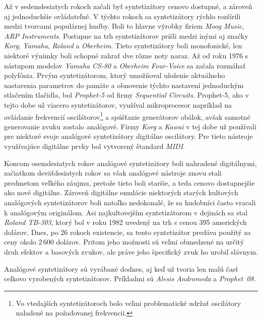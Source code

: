 Až v sedemdesiatych rokoch začali byť syntetizátory cenovo dostupné, a zároveň aj jedno\-duchšie ovládateľné. V týchto rokoch sa syntetizátory rýchlo rozšírili medzi tvorcami populárnej hudby. Boli to hlavne výrobky firiem \emph{Moog Music}, \emph{ARP Instruments}. Postupne na trh syntetizátorov prišli medzi inými aj značky \emph{Korg}, \emph{Yamaha}, \emph{Roland} a \emph{Oberheim}. Tieto syntetizátory boli monofonické, len niektoré výnimky boli schopné zahrať dve rôzne noty naraz. Až od roku 1976 s nástupom modelov \emph{Yamaha CS-80} a \emph{Oberheim Four-Voice} sa začala rozmáhať polyfónia. Prvým syntetizátorom, ktorý umožňoval uloženie aktuálneho nastavenia parametrov do pamäte a obnovenie týchto nastavení jednoduchým stlačením tlačidla, bol \emph{Prophet-5} od firmy \emph{Sequential Circuits}. Prophet-5, ako v tejto dobe už viacero syntetizátorov, využíval mikroprocesor napríklad na ovládanie frekvencií oscilátorov\footnote{Vo vtedajších syntetizátoroch bolo veľmi problematické udržať oscilátory naladené na požadovanej frekvencii.} a spúšťanie generátorov obálok, avšak samotné generovanie zvuku zostalo analógové. Firmy \emph{Korg} a \emph{Kawai} v tej dobe už používali pre niektoré svoje analógové syntetizátory digitálne oscilátory. Pre tieto nástroje využívajúce digitálne prvky bol vytvorený štandard \emph{MIDI}.

Koncom osemdesiatych rokov analógové syntetizátory boli nahradené digitálnymi, začiatkom deväťdesiatych rokov sa však analógové nástroje znovu stali predmetom veľkého záujmu, pretože tieto boli staršie, a teda cenovo dostupnejšie ako nové digitálne. Zároveň digitálne emulácie niektorých starých kultových analógových syntetizátorov boli natoľko nedokonalé, že sa hudobníci často vracali k analógovým originálom. Asi najkultovejším syntetizátorom v dejinách sa stal \emph{Roland TB-303}, ktorý bol v roku 1982 uvedený na trh s cenou 395 amerických dolárov. Dnes, po 26 rokoch existencie, sa tento syntetizátor predáva použitý za ceny okolo 2\,600 dolárov. Pritom jeho možnosti sú veľmi obmedzené na určitý druh efektov a basových zvukov, ale práve jeho špecifický zvuk ho urobil slávnym.

Analógové syntetizátory sú vyrábané dodnes, aj keď už tvoria len malú časť celkovo vyrobených syntetizátorov. Príkladmi sú \emph{Alesis Andromeda} a \emph{Prophet~08}.

